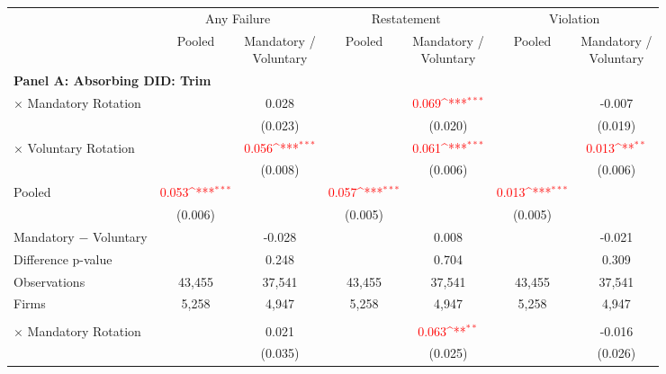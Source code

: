 \documentclass[10pt]{article}
\newcommand{\sym}[1]{\textsuperscript{#1}}
\begin{document}
\begin{minipage}{19cm}\fontsize{10}{12}\selectfont\setlength{\tabcolsep}{4pt}\renewcommand{\arraystretch}{1.12}


\def\sym#1{\ifmmode^{#1}\else\(^{#1}\)\fi}
\centering
{}
\label{tab:absorbing-transition-akm-restatement-bad-upgrade-no-auditfirm-fe}
\begin{threeparttable}

\begin{tabular}{l cc cc cc}
\toprule
 & \multicolumn{2}{c}{Any Failure} & \multicolumn{2}{c}{Restatement} & \multicolumn{2}{c}{Violation} \\
\cmidrule(lr){2-3}\cmidrule(lr){4-5}\cmidrule(lr){6-7}
 & Pooled & \shortstack{Mandatory /\\Voluntary} & Pooled & \shortstack{Mandatory /\\Voluntary} & Pooled & \shortstack{Mandatory /\\Voluntary} \\
\midrule
\multicolumn{7}{l}{\textbf{Panel A: Absorbing DID: Trim}} \\
$\times$ Mandatory Rotation &  & 0.028 &  & \textcolor{red}{0.069\sym{***}} &  & -0.007 \\
 &  & (0.023) &  & (0.020) &  & (0.019) \\
$\times$ Voluntary Rotation &  & \textcolor{red}{0.056\sym{***}} &  & \textcolor{red}{0.061\sym{***}} &  & \textcolor{red}{0.013\sym{**}} \\
 &  & (0.008) &  & (0.006) &  & (0.006) \\
Pooled & \textcolor{red}{0.053\sym{***}} &  & \textcolor{red}{0.057\sym{***}} &  & \textcolor{red}{0.013\sym{***}} &  \\
 & (0.006) &  & (0.005) &  & (0.005) &  \\
Mandatory $-$ Voluntary &  & -0.028 &  & 0.008 &  & -0.021 \\
Difference p-value &  & 0.248 &  & 0.704 &  & 0.309 \\
Observations & 43,455 & 37,541 & 43,455 & 37,541 & 43,455 & 37,541 \\
Firms & 5,258 & 4,947 & 5,258 & 4,947 & 5,258 & 4,947 \\
\addlinespace
\multicolumn{7}{l}{\textbf{Panel B: Absorbing DID: Strict}} \\
$\times$ Mandatory Rotation &  & 0.021 &  & \textcolor{red}{0.063\sym{**}} &  & -0.016 \\
 &  & (0.035) &  & (0.025) &  & (0.026) \\

\end{tabular}
\end{threeparttable}
\end{minipage}
\end{document}
